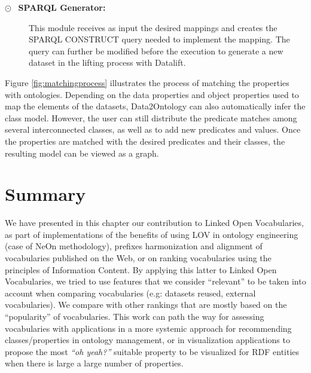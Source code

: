 \begin{description}
\begin{description}
 \item[$\odot$~ \textbf{SPARQL Generator:}] This module receives as input the desired mappings and creates the SPARQL CONSTRUCT query needed to implement the mapping. The query can further be modified before the execution to generate a new dataset in the lifting process with Datalift.

\end{description}
Figure \ref{fig:matchingprocess} illustrates the process of matching the properties with ontologies. Depending on the data properties and object properties used to map the elements of the datasets, Data2Ontology can also automatically infer the class model. However, the user can still distribute the predicate matches among several interconnected classes, as well as to add new predicates and values. Once the properties are matched with the desired predicates and their classes, the resulting model can be viewed as a graph.

 \begin{figure}

 \end{figure}


\section{Summary}
\label{ch6:conclusion}
We have presented in this chapter our contribution to Linked Open Vocabularies, as part of implementations of the benefits of using LOV in ontology engineering (case of NeOn methodology), prefixes harmonization and alignment of vocabularies published on the Web, or on ranking vocabularies using the principles of Information Content. By applying this latter to Linked Open Vocabularies, we tried to use features that we consider ``relevant'' to be taken into account when comparing vocabularies (e.g: datasets reused, external vocabularies). We compare with other rankings that are mostly based on the ``popularity'' of vocabularies. This work can path the way for assessing vocabularies with applications in a more systemic approach for recommending classes/properties in ontology management, or in visualization applications to propose the most \textit{``oh yeah?''} suitable property to be visualized for RDF entities when there is large a large number of properties.


\end{description}

